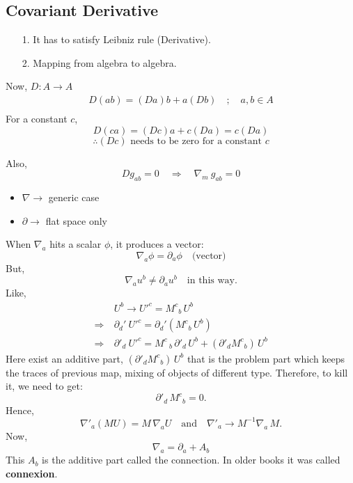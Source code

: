 \documentclass[14pt]{article} %
\begin{document}
\subsection{Covariant Derivative}

\begin{itemize}
    \item[1.] It has to satisfy Leibniz rule (Derivative).
    \item[2.] Mapping from algebra to algebra.
\end{itemize}
Now, $D : A \rightarrow A$
\begin{align*}
D(ab) = (Da)b + a(Db) \quad; \quad a, b \in A \\
\end{align*}
For a constant $c$,
\[
D(ca) = (Dc)a + c(Da) = c(Da)
\]
\[
    \therefore (Dc) \text{ needs to be zero for a constant } c
\]

Also,
\[
    D g_{ab} = 0 \quad \Rightarrow \quad \nabla_m~ g_{ab} = 0
\]

\begin{itemize}
    \item $\nabla \rightarrow$ generic case
    \item $\partial \rightarrow$ flat space only
\end{itemize}

When $\nabla_a$ hits a scalar $\phi$, it produces a vector:
\[
    \nabla_a \phi = \partial_a \phi \quad \text{(vector)}
\]
But,
\[
    \nabla_a u^b \ne \partial_a u^b \quad \text{in this way.}
\]
Like,
\begin{align*}
& U^b \rightarrow U'^c = M^c{}_b \, U^b \\
\Rightarrow ~& \partial_d'~U'^c = \partial_d' (M^c{}_b \, U^b) \\
\Rightarrow ~& \partial'_d~U'^c = M^c\,_b \,\partial'_d \,U^b + (\partial'_d M^c{}_b)\, U^b
\end{align*}
Here exist an additive part, $(\partial'_d M^c{}_b)\, U^b$ that is the problem part which keeps the traces of previous map, mixing of objects of different type. Therefore, to kill it, we need to get:
\[
\partial'_d\,M^c{}_b = 0.
\]
Hence,
\[
\nabla'_a (M U) = M \,\nabla_a U \quad \text{and} \quad \nabla'_a \rightarrow M^{-1} \nabla_a \, M.
\]
Now,
\[
\nabla_a = \partial_a + A_b
\]
This $A_b$ is the additive part called the connection. In older books it was called \textbf{connexion}.
\end{document}

